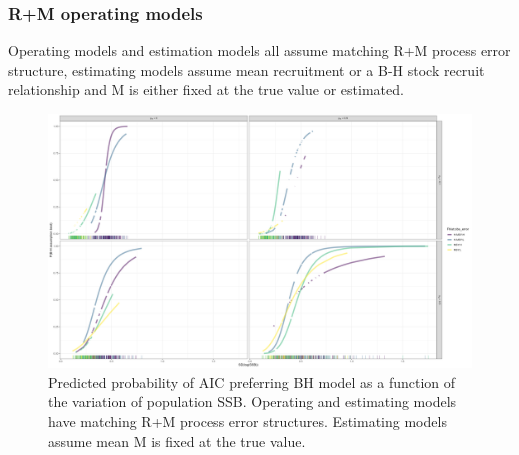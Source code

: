 \documentclass[
  12pt,
]{article}
\begin{document}
\hypertarget{rm-operating-models-1}{%
\subsubsection{R+M operating models}\label{rm-operating-models-1}}

\begin{table}
\caption{Operating models and estimation models all assume matching R+M process error structure, estimating models assume mean recruitment or a B-H stock recruit relationship and M is either fixed at the true value or estimated.}
{}
\end{table}

\begin{figure}
\caption{Predicted probability of AIC preferring BH model as a function of the variation of population SSB. Operating and estimating models have matching R+M process error structures. Estimating models assume mean M is fixed at the true value.}\label{M_om_MF_BH_glm_AIC_plots}
\begin{center}
\includegraphics[width = \textwidth]{M_om_MF_pred_BH_best.png}
\end{center}
\end{figure}
\end{document}
